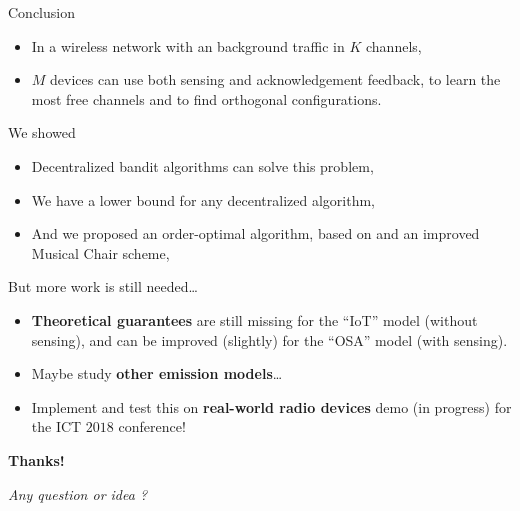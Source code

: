 \documentclass[12pt,english,ignorenonframetext,]{beamer}
\providecommand{\tightlist}{%
  \setlength{\itemsep}{0pt}\setlength{\parskip}{0pt}}
\begin{document}
\begin{frame}[allowframebreaks]{Conclusion}

\begin{itemize}
\tightlist
\item
  In a wireless network with an \iid{} background traffic in \(K\)
  channels,
\item
  \(M\) devices can use both sensing and acknowledgement feedback, to
  learn the most free channels and to find orthogonal configurations.
\end{itemize}

\begin{block}{We showed \Smiley[1.2]}

\begin{itemize}
\tightlist
\item
  Decentralized bandit algorithms can solve this problem,
\item
  We have a lower bound for any decentralized algorithm,
\item
  And we proposed an order-optimal algorithm, based on \klUCB{} and an
  improved Musical Chair scheme, \MCTopM
\end{itemize}

\end{block}

\begin{block}{But more work is still needed\ldots{} \Sey[1.2]}

\begin{itemize}
\tightlist
\item
  \textbf{Theoretical guarantees} are still missing for the ``IoT''
  model (without sensing), and can be improved (slightly) for the
  ``OSA'' model (with sensing).
\item
  Maybe study \textbf{other emission models}\ldots{}
\item
  Implement and test this on \textbf{real-world radio devices}
  \hook demo (in progress) for the ICT \(2018\) conference!
\end{itemize}

\end{block}

\begin{block}{\textbf{Thanks!} \Smiley[1.2]}

\begin{center}\begin{Large}
\emph{Any question or idea ?}
\end{Large}\end{center}

\end{block}

\end{frame}
\end{document}

